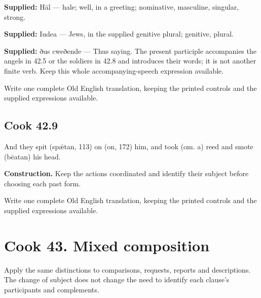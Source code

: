 \textbf{Supplied:} Hāl — hale; well, in a greeting; nominative, masculine, singular, strong.

\textbf{Supplied:} Iudea — Jews, in the supplied genitive plural; genitive, plural.

\textbf{Supplied:} ðus cweðende — Thus saying. The present participle accompanies the angels in 42.5 or the soldiers in 42.8 and introduces their words; it is not another finite verb. Keep this whole accompanying-speech expression available.

Write one complete Old English translation, keeping the printed controls and the supplied expressions available.

\par\begin{minipage}{\linewidth}\raggedright
\subsection*{Cook 42.9}

And they spit (spǣtan, 113) on (on, 172) him, and took (om. a) reed and smote (bēatan) his head.

\textbf{Construction.} Keep the actions coordinated and identify their subject before choosing each past form.

Write one complete Old English translation, keeping the printed controls and the supplied expressions available.

\end{minipage}\par\addvspace{4pt}

\section*{Cook 43. Mixed composition}

Apply the same distinctions to comparisons, requests, reports and descriptions. The change of subject does not change the need to identify each clause’s participants and complements.

